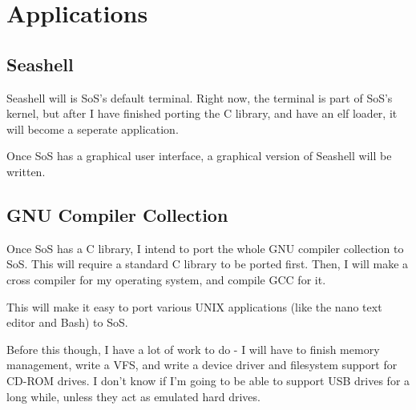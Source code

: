 \chapter{Applications}
\section{Seashell}
Seashell will is SoS's default terminal. Right now, the terminal is part of SoS's kernel, but after
I have finished porting the C library, and have an elf loader, it will become a seperate application.

Once SoS has a graphical user interface, a graphical version of Seashell will be written.

\section{GNU Compiler Collection}
Once SoS has a C library, I intend to port the whole GNU compiler collection to SoS. This will require
a standard C library to be ported first. Then, I will make a cross compiler for my operating system, and
compile GCC for it. 

This will make it easy to port various UNIX applications (like the nano text editor and Bash) to SoS. 

Before this though, I have a lot of work to do - I will have to finish memory management, write a VFS,
and write a device driver and filesystem support for CD-ROM drives. I don't know if I'm going to be able
to support USB drives for a long while, unless they act as emulated hard drives.
